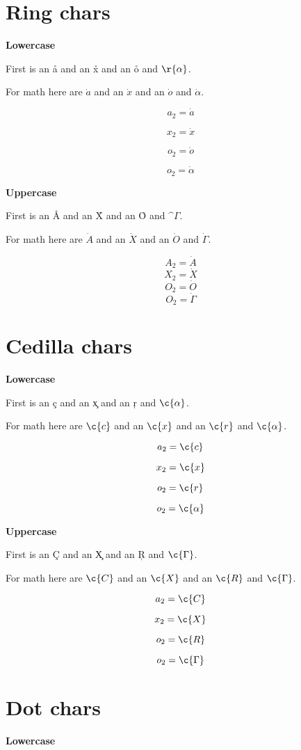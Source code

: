 \documentclass{article}
\begin{document}
\section{Ring chars}
\textbf{Lowercase}

First is an \r{a} and an \r{x} and an \r{o} and $\r{\alpha}$.

For math here are $\dot{a}$ and an $\dot{x}$ and an $\dot{o}$ and $\dot{\alpha}$.

$$a_2=\dot{a}$$

$$x_2=\dot{x}$$

$$o_2=\dot{o}$$

$$o_2=\dot{\alpha}$$


\textbf{Uppercase}

First is an \r{A} and an \r{X} and an \r{O} and $\^{\Gamma}$.

For math here are $\dot{A}$ and an $\dot{X}$ and an $\dot{O}$ and $\dot{\Gamma}$.

$$A_2=\dot{A}$$
$$X_2=\dot{X}$$
$$O_2=\dot{O}$$
$$O_2=\dot{\Gamma}$$




\section{Cedilla chars}
\textbf{Lowercase}

First is an \c{c} and an \c{x} and an \c{r} and $\c{\alpha}$.

For math here are $\c{c}$ and an $\c{x}$ and an $\c{r}$ and $\c{\alpha}$.

$$a_2=\c{c}$$

$$x_2=\c{x}$$

$$o_2=\c{r}$$

$$o_2=\c{\alpha}$$


\textbf{Uppercase}

First is an \c{C} and an \c{X} and an \c{R} and $\c{\Gamma}$.

For math here are $\c{C}$ and an $\c{X}$ and an $\c{R}$ and $\c{\Gamma}$.

$$a_2=\c{C}$$

$$x_2=\c{X}$$

$$o_2=\c{R}$$

$$o_2=\c{\Gamma}$$




\section{Dot chars}
\textbf{Lowercase}
\end{document}
